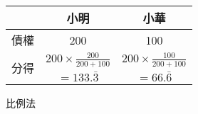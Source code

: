 \begin{center}
	\hfill
	\begin{tabular}{r|cc}
		\toprule
		& 小明 & 小華 \\
		\hline
		債權 & 200 & 100 \\
		\multirow{2}{*}{分得} & $200\times\frac{200}{200+100}$ & $200\times\frac{100}{200+100}$ \\
		& $=133.\bar{3}$ & $=66.\bar{6}$ \\
		\bottomrule
	\end{tabular}
	\hfill\textsf{\small{比例法}}
\end{center}
